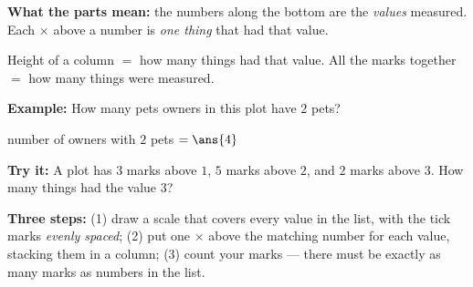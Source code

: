 \documentclass[12pt]{article}
\begin{document}


\begin{formulabox}
\textbf{What the parts mean:} the numbers along the bottom are the \emph{values} measured. Each
$\times$ above a number is \emph{one thing} that had that value.\par
Height of a column $=$ how many things had that value. \quad
All the marks together $=$ how many things were measured.
\end{formulabox}

\begin{examplebox}
\textbf{Example:} \quad How many pets owners in this plot have $2$ pets?
\par\vspace{2pt}
\begin{center}
\end{center}

number of owners with $2$ pets $= \ans{4}$
\end{examplebox}

\begin{tryitbox}
\textbf{Try it:} \quad A plot has $3$ marks above $1$, $5$ marks above $2$, and $2$ marks above $3$.
How many things had the value $3$?\\[2pt]
\end{tryitbox}


\begin{formulabox}
\textbf{Three steps:} (1) draw a scale that covers every value in the list, with the tick marks
\emph{evenly spaced}; (2) put one $\times$ above the matching number for each value, stacking them in
a column; (3) count your marks --- there must be exactly as many marks as numbers in the list.
\end{formulabox}
\end{document}
